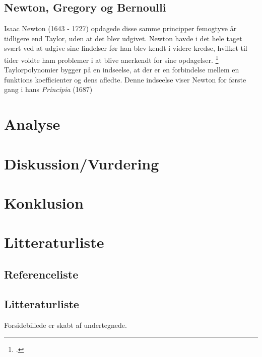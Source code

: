 \documentclass[12pt, a4paper]{article}
\begin{document}
\subsection{Newton, Gregory og Bernoulli}

Isaac Newton (1643 - 1727) opdagede disse samme principper femogtyve år tidligere end Taylor, uden at det blev udgivet. Newton havde i det hele taget svært ved at udgive sine findelser før han blev kendt i videre kredse, hvilket til tider voldte ham problemer i at blive anerkendt for sine opdagelser. \footcite{uendeligerækker}\\
Taylorpolynomier bygger på en indseelse, at der er en forbindelse mellem en funktions koefficienter og dens afledte. Denne indseelse viser Newton for første gang i hans \textit{Principia} (1687)
\section{Analyse} %
\section{Diskussion/Vurdering} %
\section{Konklusion} %

\section{Litteraturliste}
\subsection{Referenceliste}
\printbibliography
\subsection{Litteraturliste}
Forsidebillede er skabt af undertegnede.
\end{document}
